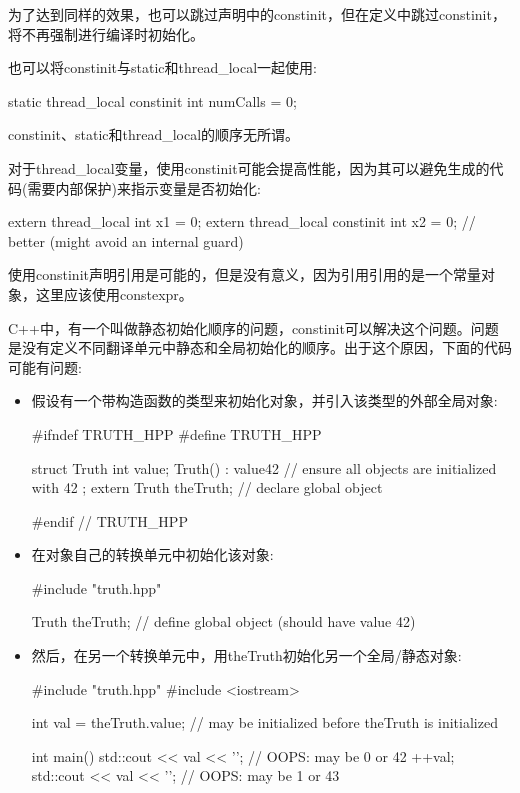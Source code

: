 为了达到同样的效果，也可以跳过声明中的constinit，但在定义中跳过constinit，将不再强制进行编译时初始化。

也可以将constinit与static和thread\_local一起使用:

\begin{cpp}
static thread_local constinit int numCalls = 0;
\end{cpp}

constinit、static和thread\_local的顺序无所谓。

对于thread\_local变量，使用constinit可能会提高性能，因为其可以避免生成的代码(需要内部保护)来指示变量是否初始化:

\begin{cpp}
extern thread_local int x1 = 0;
extern thread_local constinit int x2 = 0; // better (might avoid an internal guard)
\end{cpp}

使用constinit声明引用是可能的，但是没有意义，因为引用引用的是一个常量对象，这里应该使用constexpr。


C++中，有一个叫做静态初始化顺序的问题，constinit可以解决这个问题。问题是没有定义不同翻译单元中静态和全局初始化的顺序。出于这个原因，下面的代码可能有问题:

\begin{itemize}
\item
假设有一个带构造函数的类型来初始化对象，并引入该类型的外部全局对象:


\begin{cpp}
#ifndef TRUTH_HPP
#define TRUTH_HPP

struct Truth {
	int value;
	Truth() : value{42} { // ensure all objects are initialized with 42
	}
};
extern Truth theTruth; // declare global object

#endif // TRUTH_HPP
\end{cpp}

\item
在对象自己的转换单元中初始化该对象:


\begin{cpp}
#include "truth.hpp"

Truth theTruth; // define global object (should have value 42)
\end{cpp}

\item
然后，在另一个转换单元中，用theTruth初始化另一个全局/静态对象:


\begin{cpp}
#include "truth.hpp"
#include <iostream>

int val = theTruth.value; // may be initialized before theTruth is initialized

int main()
{
	std::cout << val << '\n'; // OOPS: may be 0 or 42
	++val;
	std::cout << val << '\n'; // OOPS: may be 1 or 43
}
\end{cpp}
\end{itemize}

